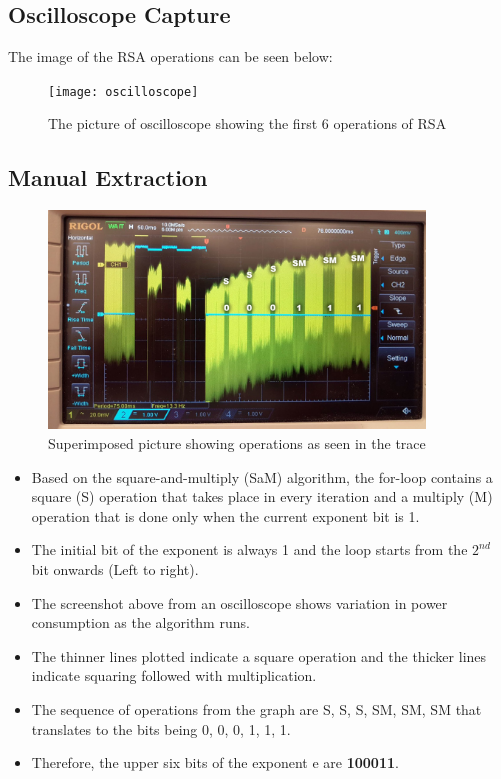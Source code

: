 \documentclass[1p,16pt]{elsarticle}
\begin{document}
\subsection{Oscilloscope Capture}%
\label{sub:oscilloscope_capture}
The image of the RSA operations can be seen below:
\begin{figure}[H]
	\centering
    \centerline{\texttt{[image: oscilloscope]}}
    \caption{The picture of oscilloscope showing the first 6 operations of RSA}\label{fig:oscilloscope}
\end{figure}

\subsection{Manual Extraction}%
\label{sub:manual_extraction}

\begin{figure}[H]
	\centering
    \centerline{\includegraphics[width=10cm]{manual_extraction}}
    \caption{Superimposed picture showing operations as seen in the trace}\label{fig:manual_extraction}
\end{figure}
\begin{itemize}

\item Based on the square-and-multiply (SaM) algorithm, the for-loop contains a square (S) operation that takes place in every iteration and a multiply (M) operation that is done only when the current exponent bit is 1.

\item The initial bit of the exponent is always 1 and the loop starts from the $2^{nd}$ bit onwards (Left to right).

\item The screenshot above from an oscilloscope shows variation in power consumption as the algorithm runs.

\item The thinner lines plotted indicate a square operation and the thicker lines indicate squaring followed with multiplication.

\item The sequence of operations from the graph are S, S, S, SM, SM, SM that translates to the bits being 0, 0, 0, 1, 1, 1.

\item Therefore, the upper six bits of the exponent e are \textbf{100011}.

\end{itemize}
\end{document}
